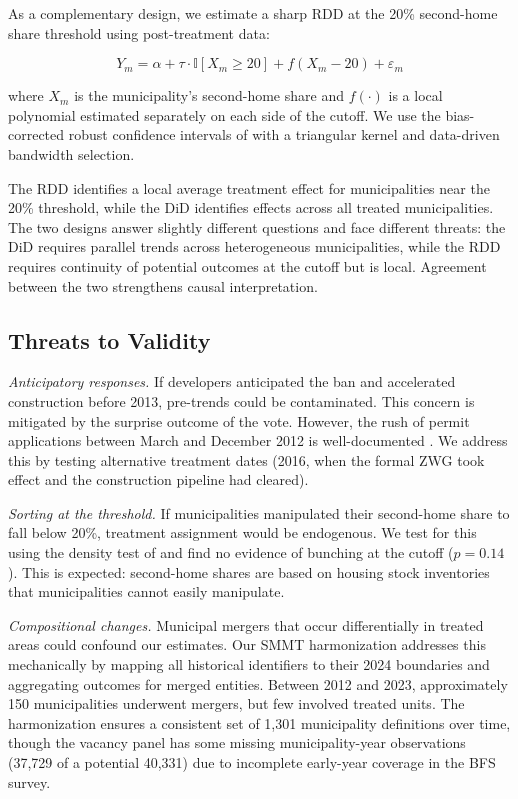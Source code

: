 \documentclass[12pt]{article}
\newcommand{\ind}{\mathbb{I}}
\begin{document}
As a complementary design, we estimate a sharp RDD at the 20\% second-home share threshold using post-treatment data:

\begin{equation}
Y_m = \alpha + \tau \cdot \ind[X_m \geq 20] + f(X_m - 20) + \varepsilon_m
\label{eq:rdd}
\end{equation}

\noindent where $X_m$ is the municipality's second-home share and $f(\cdot)$ is a local polynomial estimated separately on each side of the cutoff. We use the bias-corrected robust confidence intervals of \citet{calonico2014robust} with a triangular kernel and data-driven bandwidth selection.

The RDD identifies a local average treatment effect for municipalities near the 20\% threshold, while the DiD identifies effects across all treated municipalities. The two designs answer slightly different questions and face different threats: the DiD requires parallel trends across heterogeneous municipalities, while the RDD requires continuity of potential outcomes at the cutoff but is local. Agreement between the two strengthens causal interpretation.

\subsection{Threats to Validity}

\textit{Anticipatory responses.} If developers anticipated the ban and accelerated construction before 2013, pre-trends could be contaminated. This concern is mitigated by the surprise outcome of the vote. However, the rush of permit applications between March and December 2012 is well-documented \citep{deville2022restricting}. We address this by testing alternative treatment dates (2016, when the formal ZWG took effect and the construction pipeline had cleared).

\textit{Sorting at the threshold.} If municipalities manipulated their second-home share to fall below 20\%, treatment assignment would be endogenous. We test for this using the density test of \citet{cattaneo2020simple} and find no evidence of bunching at the cutoff ($p = 0.14$). This is expected: second-home shares are based on housing stock inventories that municipalities cannot easily manipulate.

\textit{Compositional changes.} Municipal mergers that occur differentially in treated areas could confound our estimates. Our SMMT harmonization addresses this mechanically by mapping all historical identifiers to their 2024 boundaries and aggregating outcomes for merged entities. Between 2012 and 2023, approximately 150 municipalities underwent mergers, but few involved treated units. The harmonization ensures a consistent set of 1,301 municipality definitions over time, though the vacancy panel has some missing municipality-year observations (37,729 of a potential 40,331) due to incomplete early-year coverage in the BFS survey.
\end{document}
